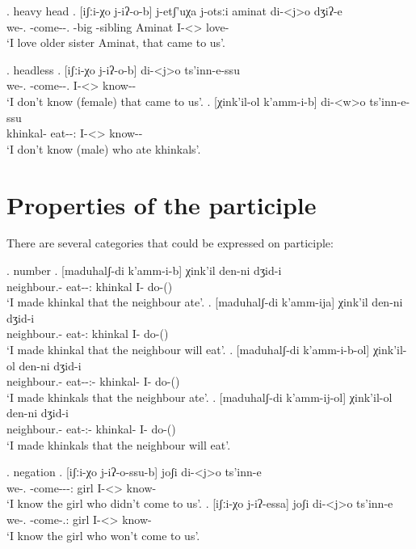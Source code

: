 \ex. heavy head
	\ag.  [iʃːi-χo j-iʔ-o-b] j-etʃ'uχa j-otsːi aminat di-<j>o dʒiʔ-e\\
			{we-\Add.\Lat} {\F-come-\Pst-\Ptcp.\Pst} {\F-big} {\F-sibling} Aminat {I-<\F>\Aff} {love-\Hab}\\
			\glt `I love older sister Aminat, that came to us'.

\ex. headless
	\ag.  [iʃːi-χo j-iʔ-o-b] di-<j>o ts'inn-e-ssu\\
			{we-\Add.\Lat} {\F-come-\Pst-\Ptcp.\Pst} {I-<\F>\Aff} {know-\Hab-\Neg}\\
			\glt `I don't know (female) that came to us'.
	\bg.  [χink'il-ol k'amm-i-b] di-<w>o ts'inn-e-ssu\\
			{khinkal-\Pl} {eat-\Pst-\Ptcp:\Pst} {I-<\M>\Aff} {know-\Hab-\Neg}\\
			\glt `I don't know (male) who ate khinkals'.

\section{Properties of the participle}
There are several categories that could be expressed on participle:

\ex. number
	\ag. [maduhalʃ-di k'amm-i-b] χink'il den-ni dʒid-i\\
			{neighbour.\Obl-\Erg} {eat-\Pst-\Ptcp:\Pst} {khinkal}  {I-\Erg} {do-\Pst(\Aor)}\\
		 \glt    `I made khinkal that the neighbour ate'.
	\bg. [maduhalʃ-di k'amm-ija] χink'il den-ni dʒid-i\\
			{neighbour.\Obl-\Erg} {eat-\Ptcp:\Pres} {khinkal}  {I-\Erg} {do-\Pst(\Aor)}\\
		 \glt    `I made khinkal that the neighbour will eat'.	
	\bg. [maduhalʃ-di k'amm-i-b-ol] χink'il-ol den-ni dʒid-i\\
			{neighbour.\Obl-\Erg} {eat-\Pst-\Ptcp:\Pst-\Pl} {khinkal-\Pl}  {I-\Erg} {do-\Pst(\Aor)}\\
		 \glt    `I made khinkals that the neighbour ate'.
	\bg. [maduhalʃ-di k'amm-ij-ol] χink'il-ol den-ni dʒid-i\\
			{neighbour.\Obl-\Erg} {eat-\Ptcp:\Pres-\Pl} {khinkal-\Pl}  {I-\Erg} {do-\Pst(\Aor)}\\
		 \glt    `I made khinkals that the neighbour will eat'.	

\ex. negation
	\ag. [iʃːi-χo j-iʔ-o-ssu-b] joʃi di-<j>o ts'inn-e \\
		  {we-\Add.\Lat} {\F-come-\Pst-\Neg-\Ptcp:\Pst} {girl} {I-<\F>\Aff} {know-\Hab}\\
		 \glt    `I know the girl who didn't come to us'.
	\bg. [iʃːi-χo j-iʔ-essa] joʃi di-<j>o ts'inn-e \\
		  {we-\Add.\Lat} {\F-come-\Neg.\Ptcp:\Pres} {girl} {I-<\F>\Aff} {know-\Hab}\\
		 \glt    `I know the girl who won't come to us'.
		 
